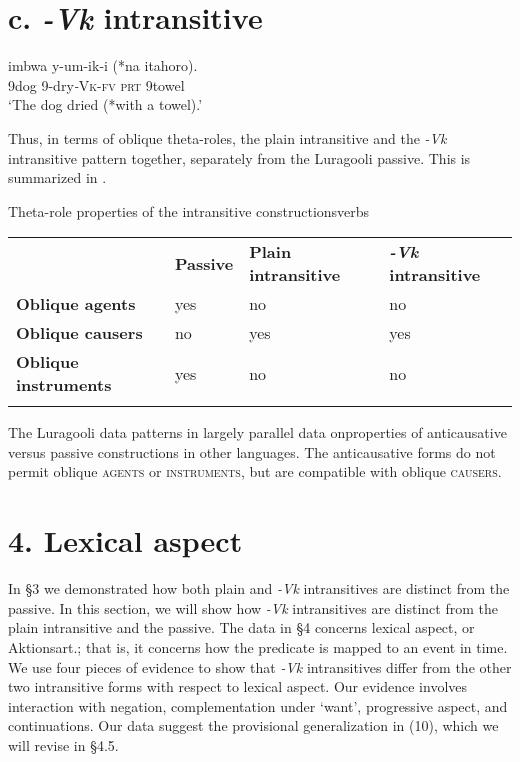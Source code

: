 \documentclass[output=paper]{langsci/langscibook}
\begin{document}
\begin{styleTabellenberschrift}
\chapter[c. {}-Vk intransitive]{c. \textbf{\textit{{}-Vk}}\textbf{ intransitive}}
\gll imbwa  y-um-ik-i      (*na  itahoro).\\
     9dog    9-dry\textit{{}-}\textsc{Vk}{}-\textsc{fv} \textsc{prt} 9towel\\
\glt ‘The dog dried (*with a towel).’
\z

Thus, in terms of oblique theta-roles, the plain intransitive and the \textit{{}-Vk} intransitive pattern together, separately from the Luragooli passive. This is summarized in .

\begin{styleTabellenberschrift}%
\begin{table}
\caption{Theta-role properties of the intransitive constructionsverbs}
\label{tab:2}
\end{table}\end{styleTabellenberschrift}

\begin{tabularx}{\textwidth}{XXXX} & \textbf{Passive} & \textbf{Plain intransitive} & \textbf{\textit{{}-Vk }}\textbf{intransitive}\\
\lsptoprule
\textbf{Oblique agents} & yes & no & no\\
\textbf{Oblique causers} & no & yes & yes\\
\textbf{Oblique instruments} & yes & no & no\\
\lspbottomrule
\end{tabularx}
The Luragooli data patterns in  largely parallel data onproperties of anticausative versus passive constructions in other languages. The anticausative forms do not permit oblique \textsc{agents} or \textsc{instruments}, but are compatible with oblique \textsc{causers.}

\chapter[4. Lexical aspect]{4. Lexical aspect}

In §3 we demonstrated how both plain and \textit{{}-Vk} intransitives are distinct from the passive. In this section, we will show how \textit{{}-Vk }intransitives are distinct from the plain intransitive and the passive. The data in §4 concerns lexical aspect, or Aktionsart.; that is, it concerns how the predicate is mapped to an event in time. We use four pieces of evidence to show that \textit{{}-Vk} intransitives differ from the other two intransitive forms with respect to lexical aspect. Our evidence involves interaction with negation, complementation under ‘want’, progressive aspect, and continuations. Our data suggest the provisional generalization in (10), which we will revise in §4.5.


\end{styleTabellenberschrift}
\end{document}
